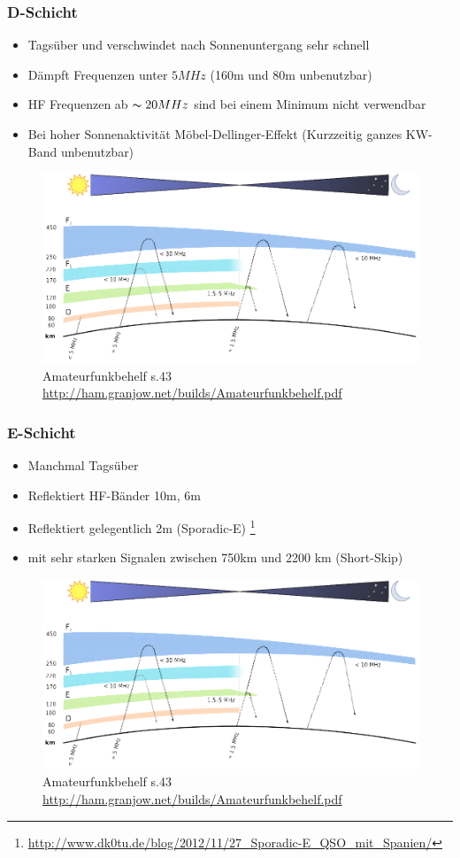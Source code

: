 \begin{frame}
  \frametitle{D-Schicht}
  \begin{itemize}
    \item Tagsüber und verschwindet nach Sonnenuntergang sehr schnell
    \item Dämpft Frequenzen unter $5MHz$ (160m und 80m unbenutzbar)
    \item HF Frequenzen ab $\thicksim20MHz$ sind bei einem Minimum nicht verwendbar
    \item Bei hoher Sonnenaktivität Möbel-Dellinger-Effekt (Kurzzeitig ganzes KW-Band unbenutzbar)
  \end{itemize}
  \begin{center}
    \begin{figure}
      \includegraphics[width=.6\textwidth,height=.4\textheight,keepaspectratio]{e09/schichten_behelf_43.png}
      \caption{Amateurfunkbehelf s.43 \ExternalLink \url{http://ham.granjow.net/builds/Amateurfunkbehelf.pdf}}
    \end{figure}
  \end{center}
\end{frame}

\begin{frame}
  \frametitle{E-Schicht}
  \begin{itemize}
    \item Manchmal Tagsüber
    \item Reflektiert HF-Bänder 10m, 6m
    \item Reflektiert gelegentlich 2m (Sporadic-E) \footnote{\tiny \url{http://www.dk0tu.de/blog/2012/11/27_Sporadic-E_QSO_mit_Spanien/}}
    \item mit sehr starken Signalen zwischen 750km und 2200 km (Short-Skip)
  \end{itemize}
  \begin{center}
    \begin{figure}
      \includegraphics[width=.8\textwidth,height=.4\textheight,keepaspectratio]{e09/schichten_behelf_43.png}
      \caption{Amateurfunkbehelf s.43 \ExternalLink \url{http://ham.granjow.net/builds/Amateurfunkbehelf.pdf}}
    \end{figure}
  \end{center}
\end{frame}

